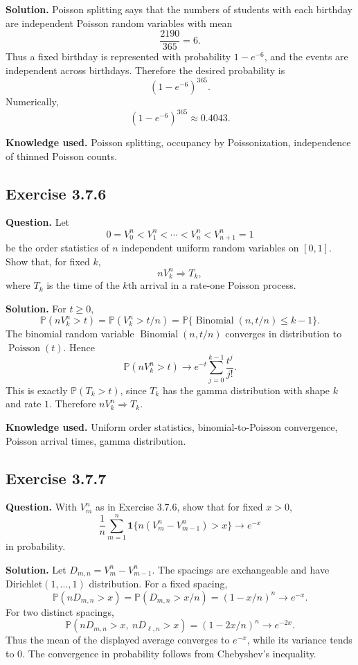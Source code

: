 \documentclass[11pt]{article}
\newcommand{\Prob}{\mathbb{P}}
\begin{document}
\textbf{Solution.}
Poisson splitting says that the numbers of students with each birthday
are independent Poisson random variables with mean
\[
  \frac{2190}{365}=6.
\]
Thus a fixed birthday is represented with probability $1-e^{-6}$, and
the events are independent across birthdays.  Therefore the desired
probability is
\[
  (1-e^{-6})^{365}.
\]
Numerically,
\[
  (1-e^{-6})^{365}\approx 0.4043.
\]

\textbf{Knowledge used.}
Poisson splitting, occupancy by Poissonization, independence of thinned
Poisson counts.

\subsection*{Exercise 3.7.6}
\textbf{Question.}
Let
\[
  0=V^n_0<V^n_1<\cdots<V^n_n<V^n_{n+1}=1
\]
be the order statistics of $n$ independent uniform random variables on
$[0,1]$.  Show that, for fixed $k$,
\[
  nV^n_k \Rightarrow T_k,
\]
where $T_k$ is the time of the $k$th arrival in a rate-one Poisson
process.

\textbf{Solution.}
For $t\ge0$,
\[
  \Prob(nV^n_k>t)
  =
  \Prob(V^n_k>t/n)
  =
  \Prob\{\operatorname{Binomial}(n,t/n)\le k-1\}.
\]
The binomial random variable $\operatorname{Binomial}(n,t/n)$ converges
in distribution to $\operatorname{Poisson}(t)$.  Hence
\[
  \Prob(nV^n_k>t)
  \to
  e^{-t}\sum_{j=0}^{k-1}\frac{t^j}{j!}.
\]
This is exactly $\Prob(T_k>t)$, since $T_k$ has the gamma distribution
with shape $k$ and rate $1$.  Therefore $nV^n_k\Rightarrow T_k$.

\textbf{Knowledge used.}
Uniform order statistics, binomial-to-Poisson convergence, Poisson
arrival times, gamma distribution.

\subsection*{Exercise 3.7.7}
\textbf{Question.}
With $V^n_m$ as in Exercise 3.7.6, show that for fixed $x>0$,
\[
  \frac1n\sum_{m=1}^n
  \mathbf{1}\{n(V^n_m-V^n_{m-1})>x\}
  \to e^{-x}
\]
in probability.

\textbf{Solution.}
Let $D_{m,n}=V^n_m-V^n_{m-1}$.  The spacings are exchangeable and have
Dirichlet$(1,\ldots,1)$ distribution.  For a fixed spacing,
\[
  \Prob(nD_{m,n}>x)=\Prob(D_{m,n}>x/n)
  =
  (1-x/n)^n\to e^{-x}.
\]
For two distinct spacings,
\[
  \Prob(nD_{m,n}>x,\ nD_{\ell,n}>x)
  =
  (1-2x/n)^n\to e^{-2x}.
\]
Thus the mean of the displayed average converges to $e^{-x}$, while its
variance tends to $0$.  The convergence in probability follows from
Chebyshev's inequality.
\end{document}
